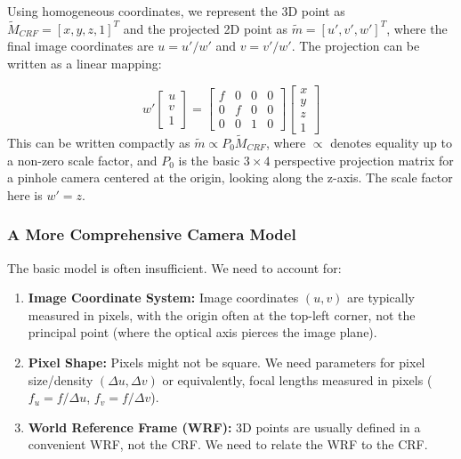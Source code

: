 Using homogeneous coordinates, we represent the 3D point as $\tilde{M}_{CRF} = [x, y, z, 1]^T$ and the projected 2D point as $\tilde{m} = [u', v', w']^T$, where the final image coordinates are $u = u'/w'$ and $v = v'/w'$. The projection can be written as a linear mapping:

\[
w' %
\begin{bmatrix}
u \\ v \\ 1
\end{bmatrix}
=
\begin{bmatrix}
f & 0 & 0 & 0 \\
0 & f & 0 & 0 \\
0 & 0 & 1 & 0
\end{bmatrix}
\begin{bmatrix}
x \\ y \\ z \\ 1
\end{bmatrix}
\]
This can be written compactly as $\tilde{m} \propto P_0 \tilde{M}_{CRF}$, where $\propto$ denotes equality up to a non-zero scale factor, and $P_0$ is the basic $3 \times 4$ perspective projection matrix for a pinhole camera centered at the origin, looking along the z-axis. The scale factor here is $w'=z$.


\subsubsection{A More Comprehensive Camera Model}

The basic model is often insufficient. We need to account for:
\begin{enumerate}
  \item \textbf{Image Coordinate System:} Image coordinates $(u, v)$ are typically measured in pixels, with the origin often at the top-left corner, not the principal point (where the optical axis pierces the image plane).
  \item \textbf{Pixel Shape:} Pixels might not be square. We need parameters for pixel size/density $(\Delta u, \Delta v)$ or equivalently, focal lengths measured in pixels ($f_u = f/\Delta u$, $f_v = f/\Delta v$).
  \item \textbf{World Reference Frame (WRF):} 3D points are usually defined in a convenient WRF, not the CRF. We need to relate the WRF to the CRF.
\end{enumerate}

